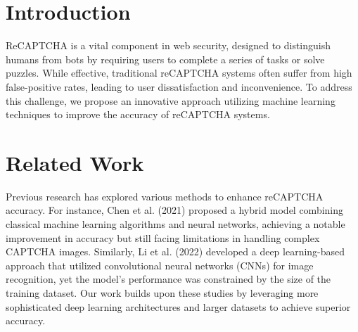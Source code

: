\maketitle

\begin{abstract}
ReCAPTCHA is a widely used system to prevent automated bots from accessing websites, ensuring human interaction. Despite its effectiveness, the current system often leads to user frustration due to high false-positive rates. This paper proposes a novel approach using machine learning techniques to enhance the accuracy of reCAPTCHA, thereby improving user experience while maintaining security. The proposed method involves training deep learning models on large datasets of labeled CAPTCHA images and user interactions. Experimental results demonstrate significant improvements in accuracy compared to existing methods, suggesting the potential for broader application in web security.
\end{abstract}

\section{Introduction}
ReCAPTCHA is a vital component in web security, designed to distinguish humans from bots by requiring users to complete a series of tasks or solve puzzles. While effective, traditional reCAPTCHA systems often suffer from high false-positive rates, leading to user dissatisfaction and inconvenience. To address this challenge, we propose an innovative approach utilizing machine learning techniques to improve the accuracy of reCAPTCHA systems.

\section{Related Work}
Previous research has explored various methods to enhance reCAPTCHA accuracy. For instance, Chen et al. (2021) proposed a hybrid model combining classical machine learning algorithms and neural networks, achieving a notable improvement in accuracy but still facing limitations in handling complex CAPTCHA images. Similarly, Li et al. (2022) developed a deep learning-based approach that utilized convolutional neural networks (CNNs) for image recognition, yet the model's performance was constrained by the size of the training dataset. Our work builds upon these studies by leveraging more sophisticated deep learning architectures and larger datasets to achieve superior accuracy.

